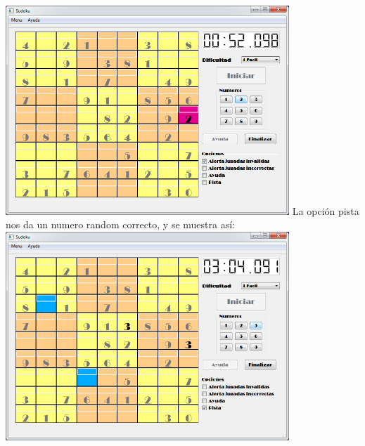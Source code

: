 \documentclass[12pt,oneside]{book}
\begin{document}
	\includegraphics[width=0.8\textwidth]{./imagenes/jugada_invalida.png}
	La opción pista nos da un numero random correcto, y se muestra así:
	\includegraphics[width=0.8\textwidth]{./imagenes/pista_juego.png}  
	
	
\end{document}
